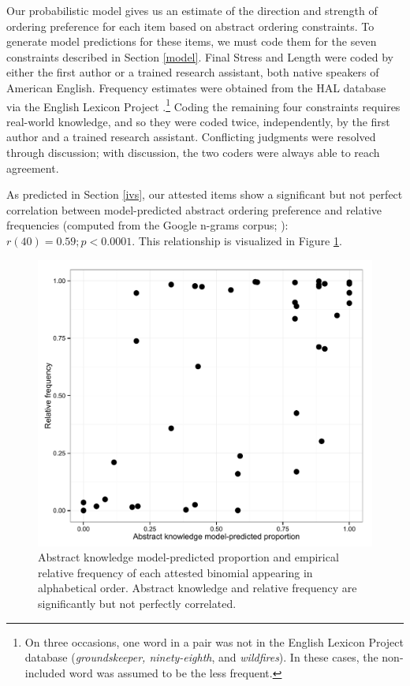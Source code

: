 \documentclass[authoryear]{elsarticle}
\begin{document}
Our probabilistic model gives us an estimate of the direction and strength of ordering preference for each item based on abstract ordering constraints. To generate model predictions for these items, we must code them for the seven constraints described in Section \ref{model}. Final Stress and Length were coded by either the first author or a trained research assistant, both native speakers of American English. Frequency estimates were obtained from the HAL database via the English Lexicon Project \citep{Balota:2007wx}.\footnote{On three occasions, one word in a pair was not in the English Lexicon Project database (\emph{groundskeeper, ninety-eighth}, and \emph{wildfires}). In these cases, the non-included word was assumed to be the less frequent.} Coding the remaining four constraints requires real-world knowledge, and so they were coded twice, independently, by the first author and a trained research assistant. Conflicting judgments were resolved through discussion; with discussion, the two coders were always able to reach agreement.

As predicted in Section \ref{ivs}, our attested items show a significant but not perfect correlation between model-predicted abstract ordering preference and relative frequencies (computed from the Google n-grams corpus; \citealp{WebTgramVersio:tv}): $r(40)=0.59; p<0.0001$. This relationship is visualized in Figure \ref{fig:model-by-freq}. 

\begin{figure}[t]
\includegraphics[scale=0.5]{model-by-freq.pdf}

\caption{Abstract knowledge model-predicted proportion and empirical relative frequency of each attested binomial appearing in alphabetical order. Abstract knowledge and relative frequency are significantly but not perfectly correlated.} 
\label{fig:model-by-freq}
\end{figure}
\end{document}

